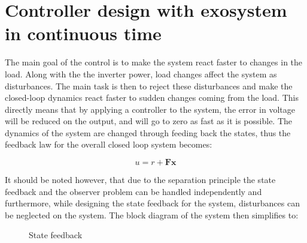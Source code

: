 \section{Controller design with exosystem in continuous time}
\label{system_design}

The main goal of the control is to make the system react faster to changes in the load. Along with the the inverter power, load changes affect the system as disturbances. The main task is then to reject these disturbances and make the closed-loop dynamics react faster to sudden changes coming from the load. This directly means that by applying a controller to the system, the error in voltage will be reduced on the output, and will go to zero as fast as it is possible. 
The dynamics of the system are changed through feeding back the states, thus the feedback law for the overall closed loop system becomes: 

\begin{equation}
  \label{eq:feedbacklaw}
  u = r + \mathbf{Fx}
  \end{equation}

It should be noted however, that due to the separation principle the state feedback and the observer problem can be handled independently and furthermore, while designing the state feedback for the system, disturbances can be neglected on the system. The block diagram of the system then simplifies to: 


\begin{figure}[H]
\centering
{}
\caption{State feedback}
\label{fig:statefeedback}
\end{figure}



